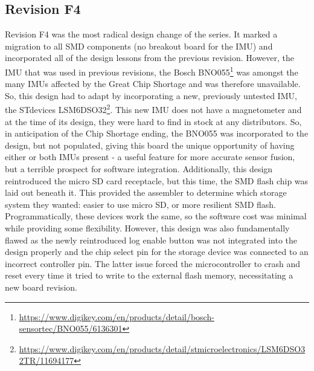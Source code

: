 
\subsection{Revision F4} 
Revision F4 was the most radical design change of the series.
It marked a migration to all SMD components (no breakout board for the IMU) and incorporated all of the design lessons from the previous revision.
However, the IMU that was used in previous revisions, the Bosch BNO055\footnote{\url{https://www.digikey.com/en/products/detail/bosch-sensortec/BNO055/6136301}} was amongst the many IMUs affected by the Great Chip Shortage and was therefore unavailable.
So, this design had to adapt by incorporating a new, previously untested IMU, the STdevices LSM6DSO32\footnote{\url{https://www.digikey.com/en/products/detail/stmicroelectronics/LSM6DSO32TR/11694177}}.
This new IMU does not have a magnetometer and at the time of its design, they were hard to find in stock at any distributors.
So, in anticipation of the Chip Shortage ending, the BNO055 was incorporated to the design, but not populated, giving this board the unique opportunity of having either or both IMUs present - a useful feature for more accurate sensor fusion, but a terrible prospect for software integration.
Additionally, this design reintroduced the micro SD card receptacle, but this time, the SMD flash chip was laid out beneath it.
This provided the assembler to determine which storage system they wanted: easier to use micro SD, or more resilient SMD flash.
Programmatically, these devices work the same, so the software cost was minimal while providing some flexibility.
However, this design was also fundamentally flawed as the newly reintroduced log enable button was not integrated into the design properly and the chip select pin for the storage device was connected to an incorrect controller pin.
The latter issue forced the microcontroller to crash and reset every time it tried to write to the external flash memory, necessitating a new board revision.


